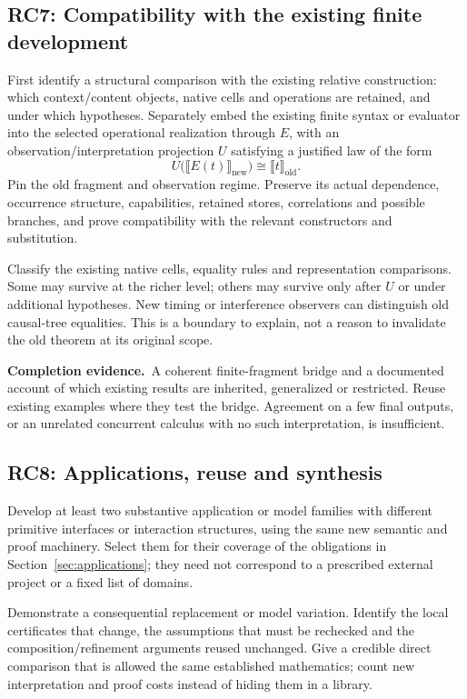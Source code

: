 \documentclass[11pt,a4paper]{article}
\newcommand{\deliver}{\par\textbf{Completion evidence.}\ }
\begin{document}
\subsection*{RC7: Compatibility with the existing finite development}\label{rc7}
First identify a structural comparison with the existing relative construction: which context/content objects, native cells and operations are retained, and under which hypotheses. Separately embed the existing finite syntax or evaluator into the selected operational realization through \(E\), with an observation/interpretation projection \(U\) satisfying a justified law of the form
\[
U\bigl(\llbracket E(t)\rrbracket_{\mathrm{new}}\bigr)
\cong \llbracket t\rrbracket_{\mathrm{old}}.
\]
Pin the old fragment and observation regime. Preserve its actual dependence, occurrence structure, capabilities, retained stores, correlations and possible branches, and prove compatibility with the relevant constructors and substitution.

Classify the existing native cells, equality rules and representation comparisons. Some may survive at the richer level; others may survive only after \(U\) or under additional hypotheses. New timing or interference observers can distinguish old causal-tree equalities. This is a boundary to explain, not a reason to invalidate the old theorem at its original scope.

\deliver A coherent finite-fragment bridge and a documented account of which existing results are inherited, generalized or restricted. Reuse existing examples where they test the bridge. Agreement on a few final outputs, or an unrelated concurrent calculus with no such interpretation, is insufficient.

\subsection*{RC8: Applications, reuse and synthesis}\label{rc8}
Develop at least two substantive application or model families with different primitive interfaces or interaction structures, using the same new semantic and proof machinery. Select them for their coverage of the obligations in Section~\ref{sec:applications}; they need not correspond to a prescribed external project or a fixed list of domains.

Demonstrate a consequential replacement or model variation. Identify the local certificates that change, the assumptions that must be rechecked and the composition/refinement arguments reused unchanged. Give a credible direct comparison that is allowed the same established mathematics; count new interpretation and proof costs instead of hiding them in a library.
\end{document}
